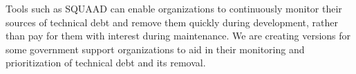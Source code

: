 Tools such as SQUAAD can enable organizations to continuously monitor their sources of technical debt and remove them quickly during development, rather than pay for them with interest during maintenance. We are creating versions for some government support organizations to aid in their monitoring and prioritization of technical debt and its removal. 

%
